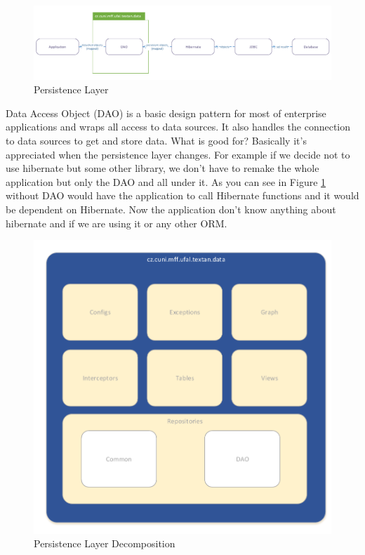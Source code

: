\begin{figure}[!htb]
        \centering
        \includegraphics[width=\textwidth]{Images/PersistentLayer}
        \caption{Persistence Layer}
        \label{fig:PersistentLayer}
\end{figure}

Data Access Object (DAO) is a basic design pattern for most of enterprise applications
and wraps all access to data sources. It also handles the connection to data sources
to get and store data. What is good for? Basically it's appreciated when the persistence
layer changes. For example if we decide not to use hibernate but some other library,
we don't have to remake the whole application but only the DAO and all under it.
As you can see in Figure \ref{fig:PersistentLayer} without DAO would have the application
to call Hibernate functions and it would be dependent on Hibernate. Now the application
don't know anything about hibernate and if we are using it or any other ORM.

\begin{figure}[!htb]
        \centering
        \includegraphics[width=\textwidth]{Images/DataDecomposition}
        \caption{Persistence Layer Decomposition}
        \label{fig:DataDecomposition}
\end{figure}

